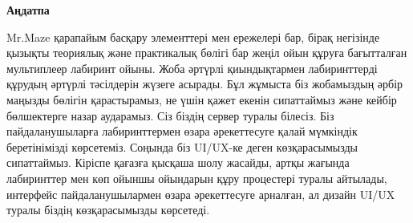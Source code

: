 \newpage
\pagestyle{plain}

{
\begin{center}
    \Large
    \textbf{Аңдатпа}
\end{center}
Mr.Maze қарапайым басқару элементтері мен ережелері бар, бірақ негізінде қызықты теориялық және практикалық бөлігі бар жеңіл ойын құруға бағытталған мультиплеер лабиринт ойыны. Жоба әртүрлі қиындықтармен лабиринттерді құрудың әртүрлі тәсілдерін жүзеге асырады. Бұл жұмыста біз жобамыздың әрбір маңызды бөлігін қарастырамыз, не үшін қажет екенін сипаттаймыз және кейбір бөлшектерге назар аударамыз. Сіз біздің сервер туралы білесіз. Біз пайдаланушыларға лабиринттермен өзара әрекеттесуге қалай мүмкіндік беретінімізді көрсетеміз. Соңында біз UI/UX-ке деген көзқарасымызды сипаттаймыз. Кіріспе қағазға қысқаша шолу жасайды, артқы жағында лабиринттер мен көп ойыншы ойындарын құру процестері туралы айтылады, интерфейс пайдаланушылармен өзара әрекеттесуге арналған, ал дизайн UI/UX туралы біздің көзқарасымызды көрсетеді.
}
